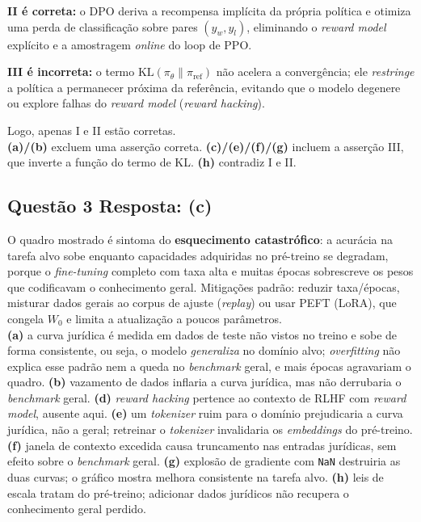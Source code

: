 \documentclass[11pt,a4paper]{article}
\begin{document}
\textbf{II é correta:} o DPO deriva a recompensa implícita da própria política e otimiza uma perda de classificação sobre pares $(y_w, y_l)$, eliminando o \textit{reward model} explícito e a amostragem \textit{online} do loop de PPO.

\textbf{III é incorreta:} o termo $\mathrm{KL}(\pi_\theta \| \pi_{\text{ref}})$ não acelera a convergência; ele \emph{restringe} a política a permanecer próxima da referência, evitando que o modelo degenere ou explore falhas do \textit{reward model} (\textit{reward hacking}).

Logo, apenas I e II estão corretas.\\
\textbf{(a)/(b)} excluem uma asserção correta.
\textbf{(c)/(e)/(f)/(g)} incluem a asserção III, que inverte a função do termo de KL.
\textbf{(h)} contradiz I e II.

\subsection*{Questão 3 \textemdash{} Resposta: (c)}
O quadro mostrado é sintoma do \textbf{esquecimento catastrófico}: a acurácia na tarefa alvo sobe enquanto capacidades adquiridas no pré-treino se degradam, porque o \textit{fine-tuning} completo com taxa alta e muitas épocas sobrescreve os pesos que codificavam o conhecimento geral. Mitigações padrão: reduzir taxa/épocas, misturar dados gerais ao corpus de ajuste (\textit{replay}) ou usar PEFT (LoRA), que congela $W_0$ e limita a atualização a poucos parâmetros.\\
\textbf{(a)} a curva jurídica é medida em dados de teste não vistos no treino e sobe de forma consistente, ou seja, o modelo \emph{generaliza} no domínio alvo; \textit{overfitting} não explica esse padrão nem a queda no \textit{benchmark} geral, e mais épocas agravariam o quadro.
\textbf{(b)} vazamento de dados inflaria a curva jurídica, mas não derrubaria o \textit{benchmark} geral.
\textbf{(d)} \textit{reward hacking} pertence ao contexto de RLHF com \textit{reward model}, ausente aqui.
\textbf{(e)} um \textit{tokenizer} ruim para o domínio prejudicaria a curva jurídica, não a geral; retreinar o \textit{tokenizer} invalidaria os \textit{embeddings} do pré-treino.
\textbf{(f)} janela de contexto excedida causa truncamento nas entradas jurídicas, sem efeito sobre o \textit{benchmark} geral.
\textbf{(g)} explosão de gradiente com \texttt{NaN} destruiria as duas curvas; o gráfico mostra melhora consistente na tarefa alvo.
\textbf{(h)} leis de escala tratam do pré-treino; adicionar dados jurídicos não recupera o conhecimento geral perdido.
\end{document}
